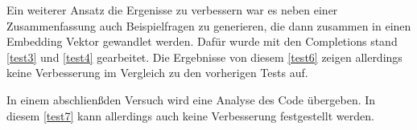 \documentclass[../main.tex]{subfiles}
\begin{document}
Ein weiterer Ansatz die Ergenisse zu verbessern war es neben einer Zusammenfassung auch Beispielfragen zu generieren, die dann zusammen in einen Embedding Vektor gewandlet werden.
Dafür wurde mit den Completions stand \ref{test3} und \ref{test4} gearbeitet.
Die Ergebnisse von diesem \ref{test6} zeigen allerdings keine Verbesserung im Vergleich zu den vorherigen Tests auf.

In einem abschlienßden Versuch wird eine Analyse des Code übergeben. 
In diesem \ref{test7} kann allerdings auch keine Verbesserung festgestellt werden.
\end{document}
